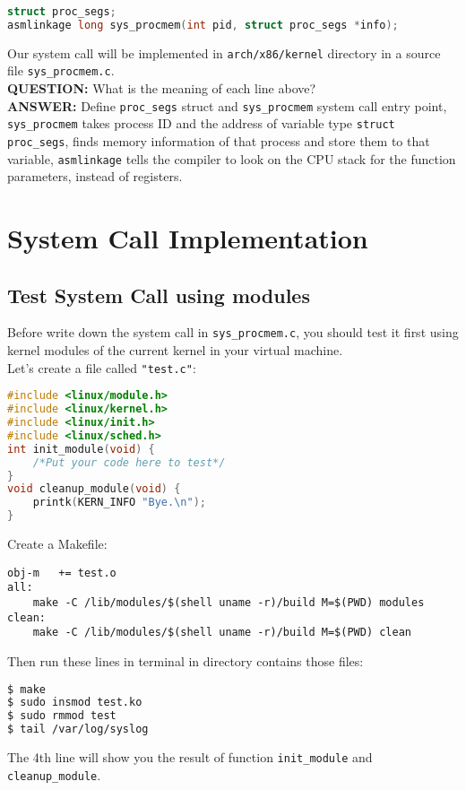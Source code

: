 \documentclass[12pt]{article}
\begin{document}
        \begin{lstlisting}[language=C++]
struct proc_segs;
asmlinkage long sys_procmem(int pid, struct proc_segs *info);\end{lstlisting}
        Our system call will be implemented in \texttt{arch/x86/kernel} directory in a source file 
        \texttt{sys\_procmem.c}.\\
        \textbf{QUESTION:} What is the meaning of each line above?\\
        \textbf{ANSWER:} Define \texttt{proc\_segs} struct and \texttt{sys\_procmem} system call entry point, 
        \texttt{sys\_procmem} takes process ID and the address of variable type \texttt{struct proc\_segs}, 
        finds memory information of that process and store them to that variable, \texttt{asmlinkage} tells 
        the compiler to look on the CPU stack for the function parameters, instead of registers.
    \section{System Call Implementation}
    \subsection{Test System Call using modules}
    Before write down the system call in \texttt{sys\_procmem.c}, you should test it first using 
    kernel modules of the current kernel in your virtual machine.\\
    Let's create a file called \texttt{"test.c"}:
    \begin{lstlisting}[language=C++]
#include <linux/module.h>
#include <linux/kernel.h>
#include <linux/init.h>
#include <linux/sched.h>
int init_module(void) {
    /*Put your code here to test*/
}
void cleanup_module(void) {
    printk(KERN_INFO "Bye.\n");
}\end{lstlisting}
    Create a Makefile:
    \begin{lstlisting}
obj-m   += test.o
all:
    make -C /lib/modules/$(shell uname -r)/build M=$(PWD) modules
clean:
    make -C /lib/modules/$(shell uname -r)/build M=$(PWD) clean\end{lstlisting}
    Then run these lines in terminal in directory contains those files:
    \begin{lstlisting}[language=bash]
$ make
$ sudo insmod test.ko
$ sudo rmmod test
$ tail /var/log/syslog\end{lstlisting}
    The 4th line will show you the result of function \texttt{init\_module} and \texttt{cleanup\_module}.
\end{document}
